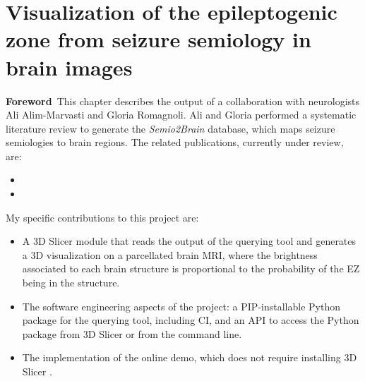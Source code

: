 \chapter[Visualization of the epileptogenic zone in brain images]{Visualization of the epileptogenic zone from seizure semiology in brain images}

\label{chap:svt}
\minitoc

\begin{center}
  \begin{minipage}[b]{0.9\linewidth}
    \small
    \textbf{Foreword\,}
    This chapter describes the output of a collaboration with neurologists Ali Alim-Marvasti and Gloria Romagnoli.
    Ali and Gloria performed a systematic literature review to generate the \textit{Semio2Brain} database, which maps seizure semiologies to brain regions.
    The related publications, currently under review, are:
    \begin{itemize}
      \item {}
      \item {}
    \end{itemize}

    My specific contributions to this project are:
    \begin{itemize}
      \item A 3D Slicer module \cite{fedorov_3d_2012} that reads the output of the querying tool and generates a 3D visualization on a parcellated brain \ac{MRI}, where the brightness associated to each brain structure is proportional to the probability of the \ac{EZ} being in the structure.
      \item The software engineering aspects of the project: a \ac{PIP}-installable Python package for the querying tool, including \ac{CI}, and an \ac{API} to access the Python package from 3D Slicer or from the command line.
      \item The implementation of the online demo, which does not require installing 3D Slicer%
      .
    \end{itemize}

  \end{minipage}
\end{center}

\acresetall
\doublespacing



